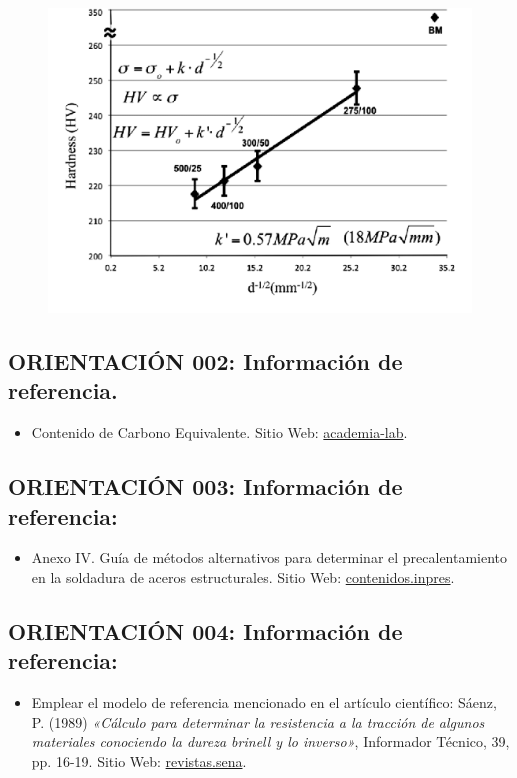 \documentclass[12pt,a4paper]{article}
\begin{document}
\begin{itemize}
            \begin{figure}[h]
                \centering
                \includegraphics[width=0.5\linewidth]{figuras/imagen 2.png}
                \label{figura2}
            \end{figure}
    \end{itemize}

    \subsection{ORIENTACIÓN 002: Información de referencia.}
    \begin{itemize}
        \item Contenido de Carbono Equivalente. Sitio Web: \href{https://academia-lab.com/enciclopedia/contenido-de-carbono-equivalente/}{academia-lab}.
    \end{itemize}

    \subsection{ORIENTACIÓN 003: Información de referencia:}
    \begin{itemize}
        \item Anexo IV. Guía de métodos alternativos para determinar el precalentamiento en la soldadura de aceros estructurales. Sitio Web: \href{http://contenidos.inpres.gob.ar/docs/Reglamentos/CIRSOC-304-Reglamento.pdf}{contenidos.inpres}.
    \end{itemize}

    \subsection{ORIENTACIÓN 004: Información de referencia:}
    \begin{itemize}
        \item Emplear el modelo de referencia mencionado en el artículo científico: Sáenz, P. (1989) \textit{«Cálculo para determinar la resistencia a la tracción de algunos materiales conociendo la dureza brinell y lo inverso»}, Informador Técnico, 39, pp. 16-19. Sitio Web: \href{https://revistas.sena.edu.co/index.php/inf_tec/article/view/1250%20%E2%80%9D%20[https://revistas.sena.edu.co/index.php/inf_tec/article/view/1250/1361]}{revistas.sena}.
    \end{itemize} 
\end{document}
